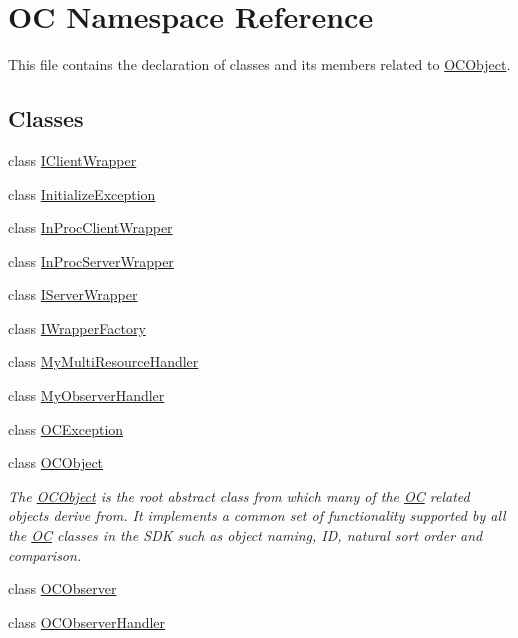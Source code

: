 \hypertarget{namespaceOC}{}\section{O\+C Namespace Reference}
\label{namespaceOC}


This file contains the declaration of classes and its members related to \hyperlink{classOC_1_1OCObject}{O\+C\+Object}.  


\subsection*{Classes}
\begin{DoxyCompactItemize}
\item 
class \hyperlink{classOC_1_1IClientWrapper}{I\+Client\+Wrapper}
\item 
class \hyperlink{classOC_1_1InitializeException}{Initialize\+Exception}
\item 
class \hyperlink{classOC_1_1InProcClientWrapper}{In\+Proc\+Client\+Wrapper}
\item 
class \hyperlink{classOC_1_1InProcServerWrapper}{In\+Proc\+Server\+Wrapper}
\item 
class \hyperlink{classOC_1_1IServerWrapper}{I\+Server\+Wrapper}
\item 
class \hyperlink{classOC_1_1IWrapperFactory}{I\+Wrapper\+Factory}
\item 
class \hyperlink{classOC_1_1MyMultiResourceHandler}{My\+Multi\+Resource\+Handler}
\item 
class \hyperlink{classOC_1_1MyObserverHandler}{My\+Observer\+Handler}
\item 
class \hyperlink{classOC_1_1OCException}{O\+C\+Exception}
\item 
class \hyperlink{classOC_1_1OCObject}{O\+C\+Object}
\begin{DoxyCompactList}\small\item\em The \hyperlink{classOC_1_1OCObject}{O\+C\+Object} is the root abstract class from which many of the \hyperlink{namespaceOC}{O\+C} related objects derive from. It implements a common set of functionality supported by all the \hyperlink{namespaceOC}{O\+C} classes in the S\+D\+K such as object naming, I\+D, natural sort order and comparison. \end{DoxyCompactList}\item 
class \hyperlink{classOC_1_1OCObserver}{O\+C\+Observer}
\item 
class \hyperlink{classOC_1_1OCObserverHandler}{O\+C\+Observer\+Handler}

\end{DoxyCompactItemize}
